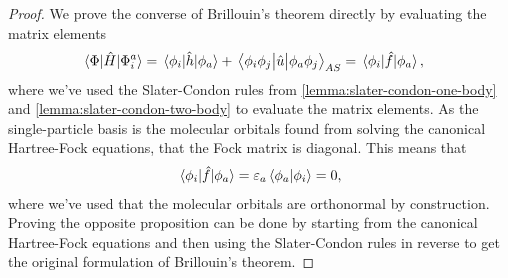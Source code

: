             \begin{proof}
                We prove the converse of Brillouin's theorem directly by
                evaluating the matrix elements
                \begin{align}
                    \mel{\Phi}{\hat{H}}{\Phi^{a}_{i}}
                    &= \mel{\phi_i}{\hat{h}}{\phi_a}
                    + \mel{\phi_i\phi_j}{\hat{u}}{\phi_a\phi_j}_{AS}
                    = \mel{\phi_i}{\hat{f}}{\phi_a},
                \end{align}
                where we've used the Slater-Condon rules from
                \autoref{lemma:slater-condon-one-body} and
                \autoref{lemma:slater-condon-two-body} to evaluate the matrix
                elements.
                As the single-particle basis is the molecular orbitals found
                from solving the canonical Hartree-Fock equations, that the Fock
                matrix is diagonal.
                This means that
                \begin{align}
                    \mel{\phi_i}{\hat{f}}{\phi_a}
                    = \varepsilon_a\braket{\phi_a}{\phi_i}
                    = 0,
                \end{align}
                where we've used that the molecular orbitals are orthonormal by
                construction.
                Proving the opposite proposition can be done by starting from
                the canonical Hartree-Fock equations and then using the
                Slater-Condon rules in reverse to get the original formulation
                of Brillouin's theorem.
            \end{proof}



